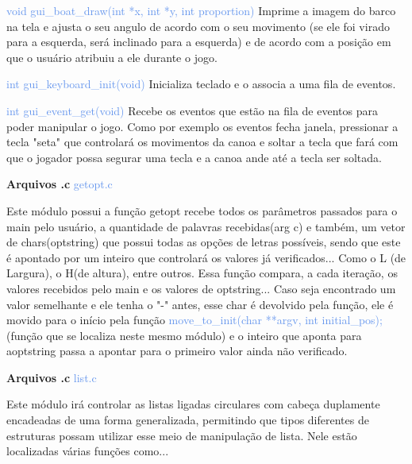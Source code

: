 \documentclass[a4paper,12pt]{article}
\begin{document}
{\textcolor{CornflowerBlue}{void gui\_boat\_draw(int *x, int *y, int proportion)}} Imprime a imagem do barco 
na tela e ajusta o seu angulo de acordo com o seu movimento (se ele foi virado para a esquerda, será inclinado 
para a esquerda) e de acordo com a posição em que o usuário atribuiu a ele durante o jogo.

{\textcolor{CornflowerBlue}{int gui\_keyboard\_init(void)} Inicializa teclado e o associa a uma fila de eventos.}

{\textcolor{CornflowerBlue}{int gui\_event\_get(void)}} Recebe os eventos que estão na fila de eventos para poder
manipular o jogo. Como por exemplo os eventos fecha janela, pressionar a tecla "seta" que controlará os movimentos 
da canoa e soltar a tecla que fará com que o jogador possa segurar uma tecla e a canoa ande até a tecla ser soltada.

\bigskip
\bigskip
\bigskip
\bigskip
\bigskip

{\Large \textcolor{NavyBlue}{ \textbf{Arquivos .c  }}}{\large \textcolor{CornflowerBlue}{  getopt.c}}
\bigskip

Este módulo possui a função getopt recebe todos os parâmetros passados para o main pelo usuário, a quantidade de palavras recebidas(arg c) e também, um vetor de chars(optstring) que possui todas as opções de letras possíveis, sendo que este é apontado por um inteiro que controlará os valores já verificados... Como o L (de Largura), o H(de altura), entre outros. Essa função compara, a cada iteração, os valores recebidos pelo main e os valores de optstring... Caso seja encontrado um valor semelhante e ele tenha o "-" antes, esse char é devolvido pela função, ele é movido para o início pela função {\textcolor{CornflowerBlue}{move\_to\_init(char **argv, int initial\_pos);}} (função que se localiza neste mesmo módulo) e o inteiro que aponta para aoptstring passa a apontar para o primeiro valor ainda não verificado.

\bigskip
\bigskip
\bigskip

\newpage %

\bigskip
\bigskip

{\Large \textcolor{NavyBlue}{ \textbf{Arquivos .c  }}}{\large \textcolor{CornflowerBlue}{  list.c}}
\bigskip

Este módulo irá controlar as listas ligadas circulares com cabeça duplamente encadeadas de uma forma generalizada, permitindo que tipos diferentes de estruturas possam utilizar esse meio de manipulação de lista.
Nele estão localizadas várias funções como...
\end{document}
